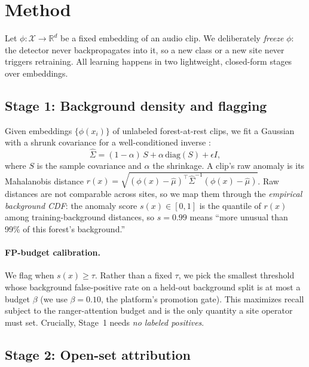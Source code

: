\section{Method}
\label{sec:method}

Let $\phi: \mathcal{X} \to \mathbb{R}^d$ be a fixed embedding of an audio clip.
We deliberately \emph{freeze} $\phi$: the detector never backpropagates into it,
so a new class or a new site never triggers retraining. All learning happens in
two lightweight, closed-form stages over embeddings.

\subsection{Stage 1: Background density and flagging}

Given embeddings $\{\phi(x_i)\}$ of unlabeled forest-at-rest clips, we fit a
Gaussian with a shrunk covariance for a well-conditioned inverse
\citep{ledoit2004shrinkage}:
\begin{equation}
\hat\Sigma = (1-\alpha)\, S + \alpha\, \mathrm{diag}(S) + \epsilon I,
\end{equation}
where $S$ is the sample covariance and $\alpha$ the shrinkage. A clip's raw
anomaly is its Mahalanobis distance \citep{lee2018mahalanobis}
$r(x) = \sqrt{(\phi(x)-\hat\mu)^\top \hat\Sigma^{-1} (\phi(x)-\hat\mu)}$.
Raw distances are not comparable across sites, so we map them through the
\emph{empirical background CDF}: the anomaly score $s(x)\in[0,1]$ is the
quantile of $r(x)$ among training-background distances, so $s = 0.99$ means
``more unusual than 99\% of this forest's background.''

\paragraph{FP-budget calibration.} We flag when $s(x) \ge \tau$. Rather than a
fixed $\tau$, we pick the smallest threshold whose background false-positive
rate on a held-out background split is at most a budget $\beta$ (we use
$\beta = 0.10$, the platform's promotion gate). This maximizes recall subject to
the ranger-attention budget and is the only quantity a site operator must set.
Crucially, Stage~1 needs \emph{no labeled positives}.

\subsection{Stage 2: Open-set attribution}

